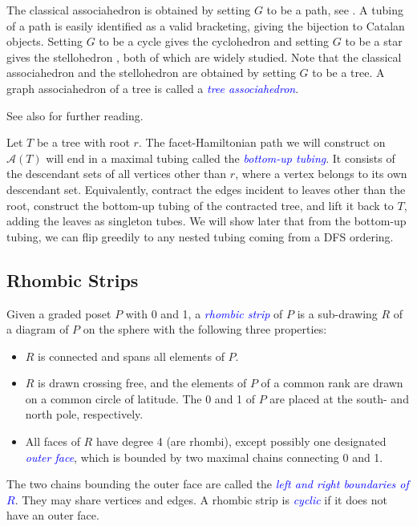\documentclass[fontsize=11pt,a4paper,DIV=12]{scrartcl}
\newcommand{\defn}[1]{\textsl{\textcolor{Blue}{#1}}}
\begin{document}
The classical associahedron is obtained by setting $G$ to be a path, see . A tubing of a path is easily identified as a valid bracketing, giving the bijection to Catalan objects. Setting $G$ to be a cycle gives the cyclohedron \cite{Cyclohedra, Cyclohedra_diameter} and setting $G$ to be a star gives the stellohedron \cite{stellohedron}, both of which are widely studied. Note that the classical associahedron and the stellohedron are obtained by setting $G$ to be a tree. A graph associahedron of a tree is called a \defn{tree associahedron}.

See also \cite{Graph_associahedra_diameter, Graph_associahedra_general, graph_properties_graph_associahedra, Graph_associahedra_realization, Elimination_trees} for further reading.

Let $T$ be a tree with root $r$. The facet-Hamiltonian path we will construct on $\mathcal A(T)$ will end in a maximal tubing called the \defn{bottom-up tubing}. It consists of the descendant sets of all vertices other than $r$, where a vertex belongs to its own descendant set. Equivalently, contract the edges incident to leaves other than the root, construct the bottom-up tubing of the contracted tree, and lift it back to $T$, adding the leaves as singleton tubes. We will show later that from the bottom-up tubing, we can flip greedily to any nested tubing coming from a DFS ordering.

\subsection{Rhombic Strips}

Given a graded poset $P$ with 0 and 1, a \defn{rhombic strip} of $P$ is a sub-drawing $R$ of a diagram of $P$ on the sphere with the following three properties:
\begin{itemize}
	\item $R$ is connected and spans all elements of $P$.
	\item $R$ is drawn crossing free, and the elements of $P$ of a common rank are drawn on a common circle of latitude. The 0 and 1 of $P$ are placed at the south- and north pole, respectively.
	\item All faces of $R$ have degree 4 (are rhombi), except possibly one designated \defn{outer face}, which is bounded by two maximal chains connecting 0 and 1.
\end{itemize}

The two chains bounding the outer face are called the \defn{left and right boundaries of $R$}. They may share vertices and edges. A rhombic strip is \defn{cyclic} if it does not have an outer face.
\end{document}
